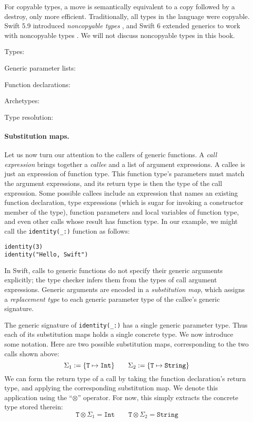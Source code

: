 \documentclass[../generics]{subfiles}
\begin{document}
For copyable types, a move is semantically equivalent to a copy followed by a destroy, only more efficient. Traditionally, all types in the language were copyable. Swift 5.9 introduced \emph{noncopyable types} \cite{se0390}, and Swift 6 extended generics to work with noncopyable types \cite{se0427}. We will not discuss noncopyable types in this book.

\begin{MoreDetails}
\item Types: 
\item Generic parameter lists: 
\item Function declarations: 
\item Archetypes: 
\item Type resolution: 
\end{MoreDetails}

\paragraph{Substitution maps.} Let us now turn our attention to the callers of generic functions. A \emph{call expression} brings together a \emph{callee} and a list of argument expressions. A callee is just an expression of function type. This function type's parameters must match the argument expressions, and its return type is then the type of the call expression. Some possible callees include an expression that names an existing function declaration, type expressions (which is sugar for invoking a constructor member of the type), function parameters and local variables of function type, and even other calls whose result has function type. In our example, we might call the \verb|identity(_:)| function as follows:
\begin{Verbatim}
identity(3)
identity("Hello, Swift")
\end{Verbatim}
In Swift, calls to generic functions do not specify their generic arguments explicitly; the type checker infers them from the types of call argument expressions. Generic arguments are encoded in a \emph{substitution map}, which assigns a \emph{replacement type} to each generic parameter type of the callee's generic signature.

The generic signature of \verb|identity(_:)| has a single generic parameter type. Thus each of its substitution maps holds a single concrete type. We now introduce some notation. Here are two possible substitution maps, corresponding to the two calls shown above:
\[
\Sigma_1 := \{\texttt{T} \mapsto \texttt{Int}\}
\qquad
\Sigma_2 := \{\texttt{T} \mapsto \texttt{String}\}
\]
We can form the return type of a call by taking the function declaration's return type, and applying the corresponding substitution map. We denote this application using the ``$\otimes$'' operator. For now, this simply extracts the concrete type stored therein:
\[\texttt{T} \otimes \Sigma_1 = \texttt{Int}
\qquad
\texttt{T} \otimes \Sigma_2 = \texttt{String}
\]
\end{document}
